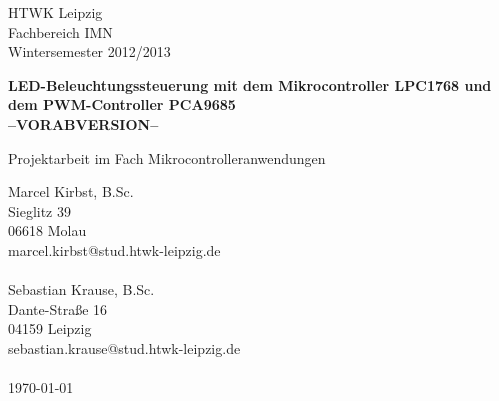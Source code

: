 \documentclass[a4paper,12pt]{scrartcl}
\begin{document}

\begin{titlepage}
HTWK Leipzig\\
Fachbereich IMN \\
Wintersemester 2012/2013




\begin{center}
\begin{Large}
\vfill {\textsf{\textbf{
LED-Beleuchtungssteuerung mit dem Mikrocontroller LPC1768 und dem PWM-Controller PCA9685
\\--VORABVERSION--\\
}}}
\end{Large}
Projektarbeit im Fach Mikrocontrolleranwendungen
\end{center}

\begin{small}
\vfill
Marcel Kirbst, B.Sc.\\
Sieglitz 39 \\
06618 Molau \\
marcel.kirbst@stud.htwk-leipzig.de\\
\\
Sebastian Krause, B.Sc.\\
Dante-Stra\ss{}e 16 \\
04159 Leipzig \\
sebastian.krause@stud.htwk-leipzig.de\\
\\
\today
\end{small}

\end{titlepage}
\addtolength{\voffset}{0cm}
\end{document}
